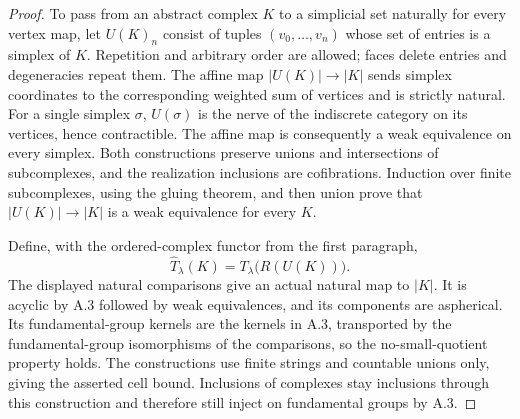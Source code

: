 \begin{proof}
To pass from an abstract complex $K$ to a simplicial set naturally
for every vertex map, let $U(K)_n$ consist of tuples
$(v_0,\ldots,v_n)$ whose set of entries is a simplex of $K$.
Repetition and arbitrary order are allowed; faces delete entries
and degeneracies repeat them. The affine map
$|U(K)|\to |K|$ sends simplex coordinates to the corresponding
weighted sum of vertices and is strictly natural. For a single
simplex $\sigma$, $U(\sigma)$ is the nerve of the indiscrete category
on its vertices, hence contractible. The affine map is consequently
a weak equivalence on every simplex. Both constructions preserve
unions and intersections of subcomplexes, and the realization
inclusions are cofibrations. Induction over finite subcomplexes,
using the gluing theorem, and then union prove that
$|U(K)|\to|K|$ is a weak equivalence for every $K$.

Define, with the ordered-complex functor from the first paragraph,
\[
 \widehat T_\lambda(K)=T_\lambda\bigl(R(U(K))\bigr).
\]
The displayed natural comparisons give an actual natural map to
$|K|$. It is acyclic by A.3 followed by weak equivalences, and its
components are aspherical. Its fundamental-group kernels are the
kernels in A.3, transported by the fundamental-group isomorphisms
of the comparisons, so the no-small-quotient property holds. The
constructions use finite strings and countable unions only, giving
the asserted cell bound. Inclusions of complexes stay inclusions
through this construction and therefore still inject on fundamental
groups by A.3.
\end{proof}

